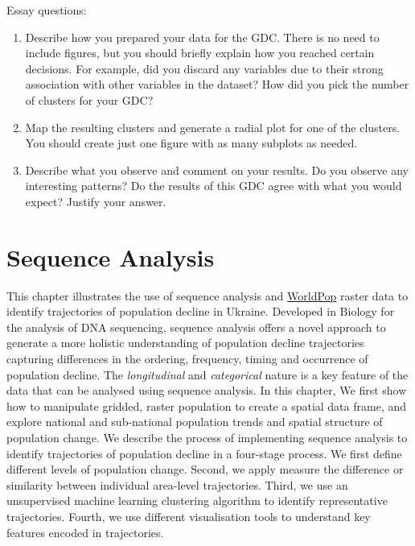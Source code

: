 \documentclass[
  letterpaper,
  DIV=11,
  numbers=noendperiod]{scrreprt}
\providecommand{\tightlist}{%
  \setlength{\itemsep}{0pt}\setlength{\parskip}{0pt}}\usepackage{longtable,booktabs,array}
\begin{document}
Essay questions:

\begin{enumerate}
\def\labelenumi{\arabic{enumi}.}
\tightlist
\item
  Describe how you prepared your data for the GDC. There is no need to
  include figures, but you should briefly explain how you reached
  certain decisions. For example, did you discard any variables due to
  their strong association with other variables in the dataset? How did
  you pick the number of clusters for your GDC?
\item
  Map the resulting clusters and generate a radial plot for one of the
  clusters. You should create just one figure with as many subplots as
  needed.
\item
  Describe what you observe and comment on your results. Do you observe
  any interesting patterns? Do the results of this GDC agree with what
  you would expect? Justify your answer.
\end{enumerate}


\hypertarget{sec-chp4}{%
\chapter{Sequence Analysis}\label{sec-chp4}}

This chapter illustrates the use of sequence analysis and
\href{https://www.worldpop.org}{WorldPop} raster data to identify
trajectories of population decline in Ukraine. Developed in Biology for
the analysis of DNA sequencing, sequence analysis offers a novel
approach to generate a more holistic understanding of population decline
trajectories capturing differences in the ordering, frequency, timing
and occurrence of population decline. The \emph{longitudinal} and
\emph{categorical} nature is a key feature of the data that can be
analysed using sequence analysis. In this chapter, We first show how to
manipulate gridded, raster population to create a spatial data frame,
and explore national and sub-national population trends and spatial
structure of population change. We describe the process of implementing
sequence analysis to identify trajectories of population decline in a
four-stage process. We first define different levels of population
change. Second, we apply measure the difference or similarity between
individual area-level trajectories. Third, we use an unsupervised
machine learning clustering algorithm to identify representative
trajectories. Fourth, we use different visualisation tools to understand
key features encoded in trajectories.
\end{document}
